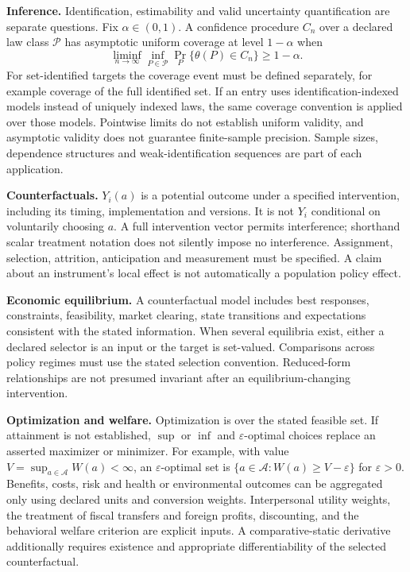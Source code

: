 \documentclass[11pt,a4paper]{article}
\begin{document}
\textbf{Inference.} Identification, estimability and valid uncertainty quantification are separate questions. Fix $\alpha\in(0,1)$. A confidence procedure $C_n$ over a declared law class $\mathcal P$ has asymptotic uniform coverage at level $1-\alpha$ when
\[
\liminf_{n\to\infty}\inf_{P\in\mathcal P}\Pr_P\{\theta(P)\in C_n\}\geq1-\alpha.
\]
For set-identified targets the coverage event must be defined separately, for example coverage of the full identified set. If an entry uses identification-indexed models instead of uniquely indexed laws, the same coverage convention is applied over those models. Pointwise limits do not establish uniform validity, and asymptotic validity does not guarantee finite-sample precision. Sample sizes, dependence structures and weak-identification sequences are part of each application.

\textbf{Counterfactuals.} $Y_i(a)$ is a potential outcome under a specified intervention, including its timing, implementation and versions. It is not $Y_i$ conditional on voluntarily choosing $a$. A full intervention vector permits interference; shorthand scalar treatment notation does not silently impose no interference. Assignment, selection, attrition, anticipation and measurement must be specified. A claim about an instrument's local effect is not automatically a population policy effect.

\textbf{Economic equilibrium.} A counterfactual model includes best responses, constraints, feasibility, market clearing, state transitions and expectations consistent with the stated information. When several equilibria exist, either a declared selector is an input or the target is set-valued. Comparisons across policy regimes must use the stated selection convention. Reduced-form relationships are not presumed invariant after an equilibrium-changing intervention.

\textbf{Optimization and welfare.} Optimization is over the stated feasible set. If attainment is not established, $\sup$ or $\inf$ and $\varepsilon$-optimal choices replace an asserted maximizer or minimizer. For example, with value $V=\sup_{a\in\mathcal A}W(a)<\infty$, an $\varepsilon$-optimal set is $\{a\in\mathcal A:W(a)\geq V-\varepsilon\}$ for $\varepsilon>0$. Benefits, costs, risk and health or environmental outcomes can be aggregated only using declared units and conversion weights. Interpersonal utility weights, the treatment of fiscal transfers and foreign profits, discounting, and the behavioral welfare criterion are explicit inputs. A comparative-static derivative additionally requires existence and appropriate differentiability of the selected counterfactual.
\end{document}
